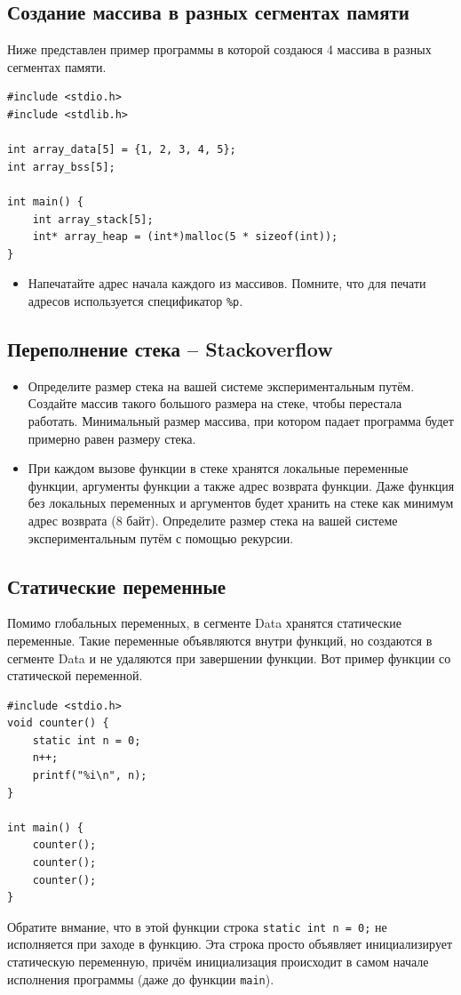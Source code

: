 \documentclass{article}
\begin{document}
\subsection*{Создание массива в разных сегментах памяти}
Ниже представлен пример программы в которой создаюся 4 массива в разных сегментах памяти.
\begin{lstlisting}
#include <stdio.h>
#include <stdlib.h>

int array_data[5] = {1, 2, 3, 4, 5};
int array_bss[5];

int main() {
    int array_stack[5];
    int* array_heap = (int*)malloc(5 * sizeof(int));
}
\end{lstlisting}
\begin{itemize}
\item Напечатайте адрес начала каждого из массивов. Помните, что для печати адресов используется спецификатор \texttt{\%p}.
\end{itemize}



\subsection*{Переполнение стека -- Stackoverflow}
\begin{itemize}
\item Определите размер стека на вашей системе экспериментальным путём. Создайте массив такого большого размера на стеке, чтобы перестала работать. Минимальный размер массива, при котором падает программа будет примерно равен размеру стека.
\item При каждом вызове функции в стеке хранятся локальные переменные функции, аргументы функции а также адрес возврата функции. Даже функция без локальных переменных и аргументов будет хранить на стеке как минимум адрес возврата (8 байт). Определите размер стека на вашей системе экспериментальным путём с помощью рекурсии.
\end{itemize}

\subsection*{Статические переменные}
Помимо глобальных переменных, в сегменте Data хранятся статические переменные. Такие переменные объявляются внутри функций, но создаются в сегменте Data и не удаляются при завершении функции. Вот пример функции со статической переменной.
\begin{lstlisting}
#include <stdio.h>
void counter() {
    static int n = 0;
    n++;
    printf("%i\n", n);
}

int main() {
    counter();
    counter();
    counter();
}
\end{lstlisting}
Обратите внмание, что в этой функции строка \texttt{static int n = 0;} не исполняется при заходе в функцию. Эта строка просто объявляет инициализирует статическую переменную, причём инициализация происходит в самом начале исполнения программы (даже до функции \texttt{main}). 
\end{document}
